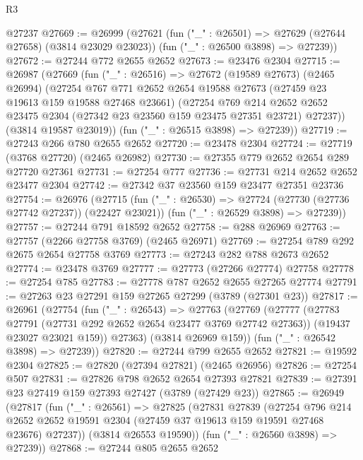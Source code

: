 \begin{lexlean}{R3}
\begin{coremodule}
    @27237
@27669 := @26999
    (@27621
      (fun ("_" : @26501) => @27629 (@27644 @27658) (@3814 @23029 @23023))
      (fun ("_" : @26500 @3898) => @27239))
@27672 := @27244 @772 @2655 @2652
@27673 := @23476 @2304
@27715 := @26987
    (@27669
      (fun ("_" : @26516) =>
      @27672
        (@19589 @27673)
        (@2465 @26994)
        (@27254
          @767
          @771
          @2652
          @2654
          @19588
          @27673
          (@27459 @23 @19613 @159 @19588 @27468 @23661)
          (@27254
            @769
            @214
            @2652
            @2652
            @23475
            @2304
            (@27342 @23 @23560 @159 @23475 @27351 @23721)
            @27237))
        (@3814 @19587 @23019))
      (fun ("_" : @26515 @3898) => @27239))
@27719 := @27243 @266 @780 @2655 @2652
@27720 := @23478 @2304
@27724 := @27719 (@3768 @27720) (@2465 @26982)
@27730 := @27355 @779 @2652 @2654 @289 @27720 @27361
@27731 := @27254 @777
@27736 := @27731 @214 @2652 @2652 @23477 @2304
@27742 := @27342 @37 @23560 @159 @23477 @27351 @23736
@27754 := @26976
    (@27715
      (fun ("_" : @26530) => @27724 (@27730 (@27736 @27742 @27237)) (@22427 @23021))
      (fun ("_" : @26529 @3898) => @27239))
@27757 := @27244 @791 @18592 @2652
@27758 := @288 @26969
@27763 := @27757 (@2266 @27758 @3769) (@2465 @26971)
@27769 := @27254 @789 @292 @2675 @2654 @27758 @3769
@27773 := @27243 @282 @788 @2673 @2652
@27774 := @23478 @3769
@27777 := @27773 (@27266 @27774) @27758
@27778 := @27254 @785
@27783 := @27778 @787 @2652 @2655 @27265 @27774
@27791 := @27263 @23 @27291 @159 @27265 @27299 (@3789 (@27301 @23))
@27817 := @26961
    (@27754
      (fun ("_" : @26543) =>
      @27763
        (@27769
          (@27777
            (@27783 @27791 (@27731 @292 @2652 @2654 @23477 @3769 @27742 @27363))
            (@19437 @23027 @23021 @159))
          @27363)
        (@3814 @26969 @159))
      (fun ("_" : @26542 @3898) => @27239))
@27820 := @27244 @799 @2655 @2652
@27821 := @19592 @2304
@27825 := @27820 (@27394 @27821) (@2465 @26956)
@27826 := @27254 @507
@27831 := @27826 @798 @2652 @2654 @27393 @27821
@27839 := @27391 @23 @27419 @159 @27393 @27427 (@3789 (@27429 @23))
@27865 := @26949
    (@27817
      (fun ("_" : @26561) =>
      @27825
        (@27831
          @27839
          (@27254
            @796
            @214
            @2652
            @2652
            @19591
            @2304
            (@27459 @37 @19613 @159 @19591 @27468 @23676)
            @27237))
        (@3814 @26553 @19590))
      (fun ("_" : @26560 @3898) => @27239))
@27868 := @27244 @805 @2655 @2652

\end{coremodule}
\end{lexlean}
